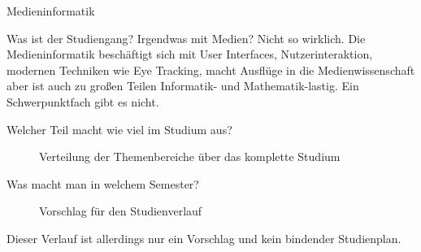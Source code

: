 	\begin{LARGE}
			Medieninformatik
		\end{LARGE}
		\begin{exampleblock}{Was ist der Studiengang?}
			Irgendwas mit Medien? Nicht so wirklich. Die Medieninformatik beschäftigt sich mit User Interfaces, Nutzerinteraktion, modernen Techniken wie Eye Tracking, macht Ausflüge in die Medienwissenschaft aber ist auch zu großen Teilen Informatik- und Mathematik-lastig. Ein Schwerpunktfach gibt es nicht.
		\end{exampleblock}
	
	\begin{block}{Welcher Teil macht wie viel im Studium aus?}
		\begin{figure}[h!]
			\caption{Verteilung der Themenbereiche über das komplette Studium}
		\end{figure}
	\end{block}
	
	\begin{block}{Was macht man in welchem Semester?}
		\begin{figure}[h!]
			\caption{Vorschlag für den Studienverlauf}
		\end{figure}
		Dieser Verlauf ist allerdings nur ein Vorschlag und kein bindender Studienplan.
	\end{block}
